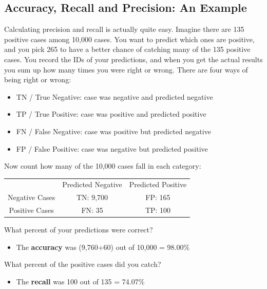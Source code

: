 \documentclass[]{report}
\begin{document}
\subsection{Accuracy, Recall and Precision: An Example}
Calculating precision and recall is actually quite easy. Imagine there are 135 positive cases among 10,000 cases. You want to predict which ones are positive, and you pick 265 to have a better chance of catching many of the 135 positive cases.  You record the IDs of your predictions, and when you get the actual results you sum up how many times you were right or wrong. There are four ways of being right or wrong:

\begin{itemize}
\item TN / True Negative: case was negative and predicted negative
\item TP / True Positive: case was positive and predicted positive
\item FN / False Negative: case was positive but predicted negative
\item FP / False Positive: case was negative but predicted positive
\end{itemize}

Now count how many of the 10,000 cases fall in each category:
\begin{center}
\begin{tabular}{|c|c|c|}
  \hline
&Predicted Negative & Predicted Positive\\
Negative Cases & TN: 9,700 & FP: 165 \\
Positive Cases & FN: 35 & TP: 100 \\

  \hline
\end{tabular}
\end{center}


What percent of your predictions were correct?

\begin{itemize}
\item The \textbf{accuracy} was (9,760+60) out of 10,000 = 98.00\%
\end{itemize}

What percent of the positive cases did you catch?

\begin{itemize}
\item The \textbf{recall} was 100 out of 135 = 74.07\%
\end{itemize}
\end{document}
